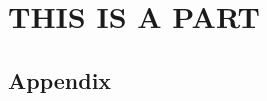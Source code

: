 \documentclass[11pt,a4paper,twoside,openright, showtrims, oldfontcommands]{memoir}
\begin{document}





\cleartorecto\tableofcontents
\renewcommand*\listfigurename{List of Figures}
\cleartorecto\listoffigures
\renewcommand*\listtablename{List of Tables}
\cleartorecto\listoftables 






\mainmatter
{}


\part{THIS IS A PART}





\appendix

\chapter{Appendix}
\end{document}
